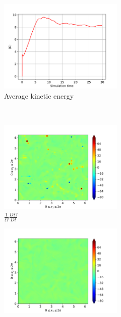 \begin{figure}[H]
    \begin{subfigure}[H]{0.45\textwidth}
        \includegraphics[height=1.75in]{media/run-cds-65/enst-average1335}
        \caption{Average kinetic energy}
    \end{subfigure}
    ~
    \begin{subfigure}[H]{0.45\textwidth}
        \includegraphics[height=1.75in]{media/run-cds-65/enst-1335}
        \caption{$\frac{1}{\Omega} \frac{D \Omega}{Dt}$}
    \end{subfigure}
    \newline
    \begin{subfigure}{0.45\textwidth}
        \includegraphics[height=1.75in]{media/run-cds-65/A-enst-1335}

\end{subfigure}
\end{figure}
